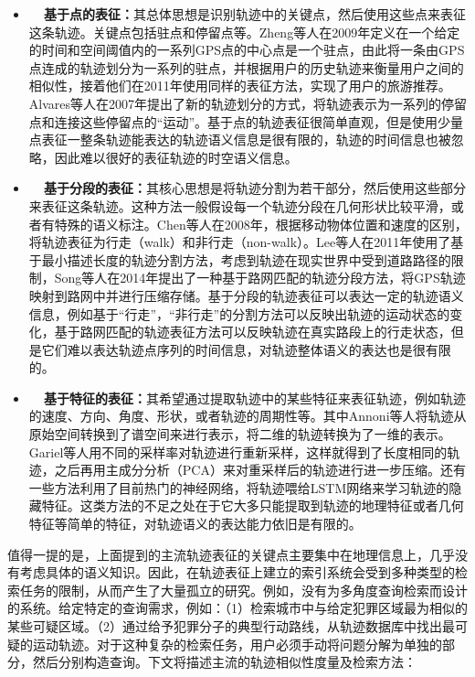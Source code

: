 \begin{itemize}
    \item \textbf{~~基于点的表征：}其总体思想是识别轨迹中的关键点，然后使用这些点来表征这条轨迹。关键点包括驻点和停留点等。Zheng等人在2009年定义在一个给定的时间和空间阈值内的一系列GPS点的中心点是一个驻点，由此将一条由GPS点连成的轨迹划分为一系列的驻点，并根据用户的历史轨迹来衡量用户之间的相似性，接着他们在2011年使用同样的表征方法，实现了用户的旅游推荐。Alvares等人在2007年提出了新的轨迹划分的方式，将轨迹表示为一系列的停留点和连接这些停留点的“运动”。基于点的轨迹表征很简单直观，但是使用少量点表征一整条轨迹能表达的轨迹语义信息是很有限的，轨迹的时间信息也被忽略，因此难以很好的表征轨迹的时空语义信息。

    \item \textbf{~~基于分段的表征：}其核心思想是将轨迹分割为若干部分，然后使用这些部分来表征这条轨迹。这种方法一般假设每一个轨迹分段在几何形状比较平滑，或者有特殊的语义标注。Chen等人在2008年，根据移动物体位置和速度的区别，将轨迹表征为行走（walk）和非行走（non-walk）。Lee等人在2011年使用了基于最小描述长度的轨迹分割方法，考虑到轨迹在现实世界中受到道路路径的限制，Song等人在2014年提出了一种基于路网匹配的轨迹分段方法，将GPS轨迹映射到路网中并进行压缩存储。基于分段的轨迹表征可以表达一定的轨迹语义信息，例如基于“行走”，“非行走”的分割方法可以反映出轨迹的运动状态的变化，基于路网匹配的轨迹表征方法可以反映轨迹在真实路段上的行走状态，但是它们难以表达轨迹点序列的时间信息，对轨迹整体语义的表达也是很有限的。

    \item \textbf{~~基于特征的表征：}其希望通过提取轨迹中的某些特征来表征轨迹，例如轨迹的速度、方向、角度、形状，或者轨迹的周期性等。其中Annoni等人将轨迹从原始空间转换到了谱空间来进行表示，将二维的轨迹转换为了一维的表示。Gariel等人用不同的采样率对轨迹进行重新采样，这样就得到了长度相同的轨迹，之后再用主成分分析（PCA）来对重采样后的轨迹进行进一步压缩。还有一些方法利用了目前热门的神经网络，将轨迹喂给LSTM网络来学习轨迹的隐藏特征。这类方法的不足之处在于它大多只能提取到轨迹的地理特征或者几何特征等简单的特征，对轨迹语义的表达能力依旧是有限的。
\end{itemize}

值得一提的是，上面提到的主流轨迹表征的关键点主要集中在地理信息上，几乎没有考虑具体的语义知识。因此，在轨迹表征上建立的索引系统会受到多种类型的检索任务的限制，从而产生了大量孤立的研究。例如，没有为多角度查询检索而设计的系统。给定特定的查询需求，例如：（1）检索城市中与给定犯罪区域最为相似的某些可疑区域。（2）通过给予犯罪分子的典型行动路线，从轨迹数据库中找出最可疑的运动轨迹。对于这种复杂的检索任务，用户必须手动将问题分解为单独的部分，然后分别构造查询。下文将描述主流的轨迹相似性度量及检索方法：





